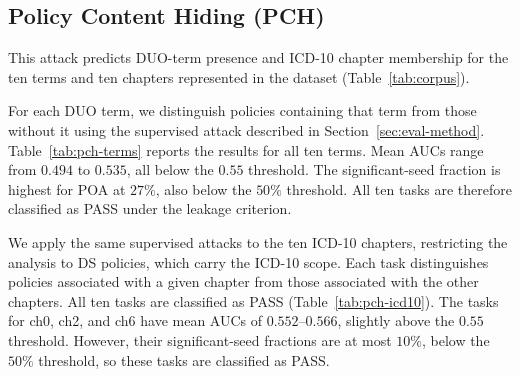 \subsection{Policy Content Hiding (PCH)}
\label{sec:eval-pch}

This attack predicts DUO-term presence and ICD-10 chapter membership for the ten terms and ten chapters represented in the dataset (Table~\ref{tab:corpus}).

For each DUO term, we distinguish policies containing that term from those without it using the supervised attack described in Section~\ref{sec:eval-method}.
Table~\ref{tab:pch-terms} reports the results for all ten terms.
Mean AUCs range from $0.494$ to $0.535$, all below the $0.55$ threshold.
The significant-seed fraction is highest for POA at $27\%$, also below the $50\%$ threshold.
All ten tasks are therefore classified as PASS under the leakage criterion.



We apply the same supervised attacks to the ten ICD-10 chapters, restricting the analysis to DS policies, which carry the ICD-10 scope.
Each task distinguishes policies associated with a given chapter from those associated with the other chapters.
All ten tasks are classified as PASS (Table~\ref{tab:pch-icd10}).
The tasks for ch0, ch2, and ch6 have mean AUCs of $0.552$--$0.566$, slightly above the $0.55$ threshold.
However, their significant-seed fractions are at most $10\%$, below the $50\%$ threshold, so these tasks are classified as PASS.



